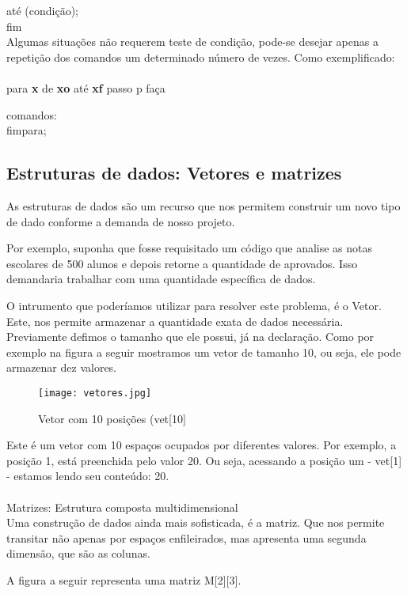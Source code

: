 \documentclass[journal]{IEEEtran}
\begin{document}
	até (condição);
\\fim
\\

Algumas situações não requerem teste de condição, pode-se desejar apenas a repetição dos comandos um determinado número de vezes. Como exemplificado:
\\
\\para \textbf{x} de \textbf{xo} até \textbf{xf} passo p faça

	comandos:
\\fimpara;


\subsection{Estruturas de dados: Vetores e matrizes}

As estruturas de dados são um recurso que nos permitem construir um novo tipo de dado conforme a demanda de nosso projeto.


Por exemplo, suponha que fosse requisitado um código que analise as notas escolares de 500 alunos e depois retorne a quantidade de aprovados. Isso demandaria trabalhar com uma quantidade específica de dados.


O intrumento que poderíamos utilizar para resolver este problema, é o Vetor. Este, nos permite armazenar a quantidade exata de dados necessária. Previamente defimos o tamanho que ele possui, já na declaração. Como por exemplo na figura a seguir mostramos um vetor de tamanho 10, ou seja, ele pode armazenar dez valores.

\begin{figure}[!htbp]
\centering
\texttt{[image: vetores.jpg]}
\caption{Vetor com 10 posições (vet[10]}
\label{fig:fig_exemple}
\end{figure}

Este é um vetor com 10 espaços ocupados por diferentes valores. Por exemplo, a posição 1, está preenchida pelo valor 20. Ou seja, acessando a posição um - vet[1] - estamos lendo seu conteúdo: 20.
\\
\\Matrizes: Estrutura composta multidimensional
\\

Uma construção de dados ainda mais sofisticada, é a matriz. Que nos permite transitar não apenas por espaços enfileirados, mas apresenta uma segunda dimensão, que são as colunas.

A figura a seguir representa uma matriz M[2][3].
\end{document}

